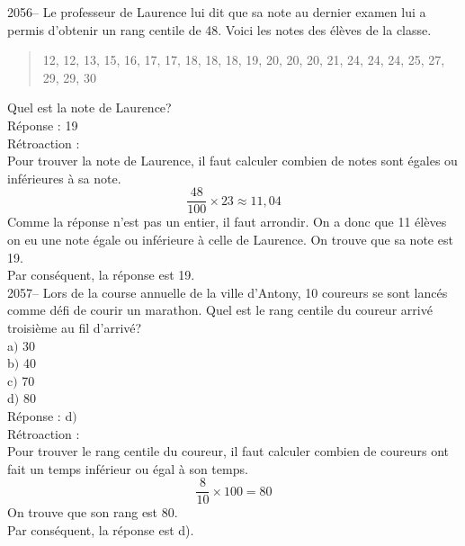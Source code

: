 \documentclass[letterpaper, 12pt]{article}
\begin{document}

2056-- Le professeur de Laurence lui dit que sa note au dernier examen lui a permis d'obtenir un rang centile de 48.  Voici les notes des \'el\`eves de la classe.
\begin{quote}
12, 12, 13, 15, 16, 17, 17, 18, 18, 18, 19, 20, 20, 20, 21, 24, 24, 24, 25, 27, 29, 29, 30
\end{quote}
Quel est la note de Laurence? \\

R\'eponse : 19\\

R\'etroaction :\\
Pour trouver la note de Laurence, il faut calculer combien de notes sont \'egales ou inf\'erieures \`a sa note.\\
\begin{equation*}
 \frac{48}{100}\times 23 \approx 11,04
\end{equation*}
Comme la r\'eponse n'est pas un entier, il faut arrondir. On a donc que 11 \'el\`eves on eu une note \'egale ou inf\'erieure \`a celle de Laurence. On trouve que sa note est 19.\\
Par cons\'equent, la r\'eponse est 19.\\

2057-- Lors de la course annuelle de la ville d'Antony, 10 coureurs se sont lanc\'es comme d\'efi de courir un marathon. Quel est le rang centile du coureur arriv\'e troisi\`eme au fil d'arriv\'e?\\

a$)$ 30\\
b$)$ 40\\
c$)$ 70\\
d$)$ 80\\

R\'eponse : d$)$\\

R\'etroaction :\\
Pour trouver le rang centile du coureur, il faut calculer combien de coureurs ont fait un temps inf\'erieur ou \'egal \`a son temps. \\
\begin{equation*}
 \frac{8}{10}\times 100 = 80
\end{equation*}
On trouve que son rang est 80.\\
Par cons\'equent, la r\'eponse est d).\\

\end{document}

